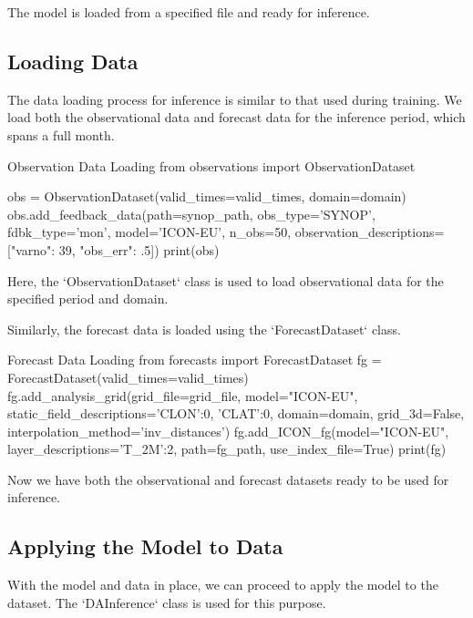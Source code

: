 The model is loaded from a specified file and ready for inference.

%
\subsection{Loading Data}

The data loading process for inference is similar to that used during training. We load both the observational data and forecast data for the inference period, which spans a full month.

\begin{codeonly}{Observation Data Loading}
from observations import ObservationDataset

obs = ObservationDataset(valid_times=valid_times, domain=domain)
obs.add_feedback_data(path=synop_path, obs_type='SYNOP', fdbk_type='mon', model='ICON-EU', n_obs=50, observation_descriptions=[{"varno": 39, "obs_err": .5}])
print(obs)
\end{codeonly}

Here, the `ObservationDataset` class is used to load observational data for the specified period and domain.

Similarly, the forecast data is loaded using the `ForecastDataset` class.

\begin{codeonly}{Forecast Data Loading}
from forecasts import ForecastDataset
fg = ForecastDataset(valid_times=valid_times)
fg.add_analysis_grid(grid_file=grid_file, model="ICON-EU", static_field_descriptions={'CLON':0, 'CLAT':0}, domain=domain, grid_3d=False, interpolation_method='inv_distances')
fg.add_ICON_fg(model="ICON-EU", layer_descriptions={'T_2M':2}, path=fg_path, use_index_file=True)
print(fg)
\end{codeonly}

Now we have both the observational and forecast datasets ready to be used for inference.

%
\subsection{Applying the Model to Data}

With the model and data in place, we can proceed to apply the model to the dataset. The `DAInference` class is used for this purpose.

